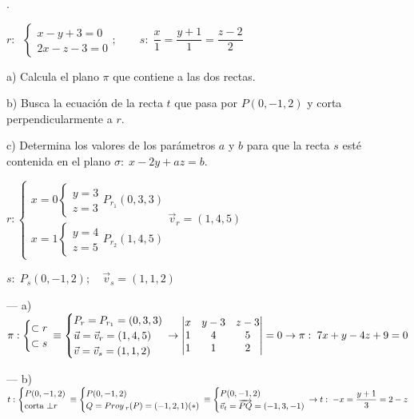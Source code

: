 \begin{ejre}.

\noindent $r:\;\; \begin{cases} x-y+3=0\\2x-z-3=0 \end{cases};\qquad s:\;\dfrac{x}{1}=\dfrac{y+1}{1}=\dfrac{z-2}{2}$

a) Calcula el plano $\pi$ que contiene a las dos rectas.

b) Busca la ecuación de la recta $t$ que pasa por $P(0,-1,2)$ y corta perpendicularmente a $r$.

c) Determina los valores de los parámetros $a$ y $b$ para que la recta $s$ esté contenida en el plano $\sigma:\; x-2y+az=b$.
\end{ejre}
\begin{proofw}\renewcommand{\qedsymbol}{$\diamond$}	
	
\noindent $r:\begin{cases}
x=0 \begin{cases}y=3\\z=3\end{cases} P_{r_1}(0,3,3)
\\
x=1 \begin{cases}y=4\\z=5\end{cases} P_{r_2}(1,4,5)
\end{cases} \vec v_r=(1,4,5)$

\noindent $s:\; P_s(0,-1,2);\quad \vec v_s=(1,1,2)$

\noindent --- a) $\pi: \begin{cases} \subset r \\ \subset s \end{cases} \hspace{-3mm} \equiv \begin{cases} P_r=P_{r_1}=(0,3,3) \\ \vec u = \vec v_r=(1,4,5) \\ \vec v = \vec v_s = (1,1,2) \end{cases} \hspace{-3mm} \to \abs{ \begin{matrix} x&y-3&z-3\\1&4&5\\1&1&2 \end{matrix} }=0 \to \pi:\; 7x+y-4z+9=0$

\noindent --- b) $t:\begin{cases} P(0,-1,2) \\ \text{corta }\bot r \end{cases} \hspace{-3mm}\equiv \begin{cases} P(0,-1,2)\\Q=Proy_{\;r}(P)=(-1,2,1)(*) \end{cases}\hspace{-3mm}\equiv \begin{cases}P(0,-1,2)\\\vec v_t=\overrightarrow{PQ}=(-1,3,-1)\end{cases} \hspace{-3mm} \to t:\; -x=\dfrac {y+1}3=2-z$


\end{proofw}
